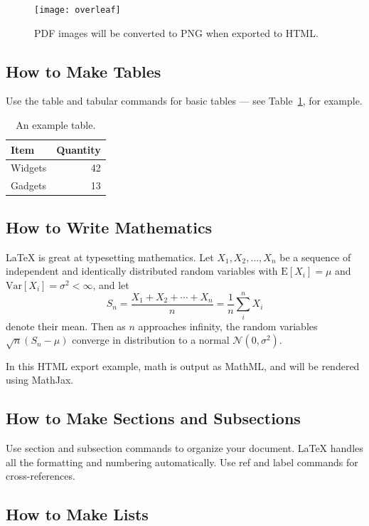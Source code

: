 \documentclass[a4paper,11pt]{article}
\begin{document}
\begin{figure}
\centering
\texttt{[image: overleaf]}
\caption{PDF images will be converted to PNG when exported to HTML.}
\end{figure}

\subsection{How to Make Tables}

Use the table and tabular commands for basic tables --- see Table~\ref{tab:widgets}, for example.

\begin{table}
\centering
\begin{tabular}{l|r}
Item & Quantity \\\hline
Widgets & 42 \\
Gadgets & 13
\end{tabular}
\caption{\label{tab:widgets}An example table.}
\end{table}

\subsection{How to Write Mathematics}

\LaTeX{} is great at typesetting mathematics. Let $X_1, X_2, \ldots, X_n$ be a sequence of independent and identically distributed random variables with $\text{E}[X_i] = \mu$ and $\text{Var}[X_i] = \sigma^2 < \infty$, and let
$$S_n = \frac{X_1 + X_2 + \cdots + X_n}{n}
      = \frac{1}{n}\sum_{i}^{n} X_i$$
denote their mean. Then as $n$ approaches infinity, the random variables $\sqrt{n}(S_n - \mu)$ converge in distribution to a normal $\mathcal{N}(0, \sigma^2)$.

In this HTML export example, math is output as MathML, and will be rendered using MathJax.

\subsection{How to Make Sections and Subsections}

Use section and subsection commands to organize your document. \LaTeX{} handles all the formatting and numbering automatically. Use ref and label commands for cross-references.

\subsection{How to Make Lists}
\end{document}
